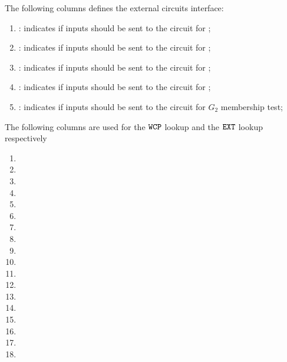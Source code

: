 The following columns defines the external circuits interface:
\begin{enumerate}[resume]
    \item \both{\csEcrecover}: indicates if inputs should be sent to the circuit for \instEcrecover{};
    \item \both{\csEcadd}: indicates if inputs should be sent to the circuit for \instEcadd{};
    \item \both{\csEcmul}: indicates if inputs should be sent to the circuit for \instEcmul{};
    \item \both{\csEcpairing}: indicates if inputs should be sent to the circuit for \instEcpairing{};
    \item \both{\csGTwo}: indicates if inputs should be sent to the circuit for $G_2$ membership test;
\end{enumerate}
The following columns are used for the $\texttt{WCP}$ lookup and the $\texttt{EXT}$ lookup respectively
\begin{multicols}{2}
      \begin{enumerate}[resume]
            \item \wcpFlag
            \item \wcpArgOneHi
            \item \wcpArgOneLo
            \item \wcpArgTwoHi
            \item \wcpArgTwoLo
            \item \wcpRes
            \item \wcpInst
            \item \extFlag
            \item \extArgOneHi
            \item \extArgOneLo
            \item \extArgTwoHi
            \item \extArgTwoLo
            \item \extArgThreeHi
            \item \extArgThreeLo
            \item \extResHi
            \item \extResLo
            \item \extInst
            \item[\vspace{\fill}]
      \end{enumerate}
\end{multicols}
